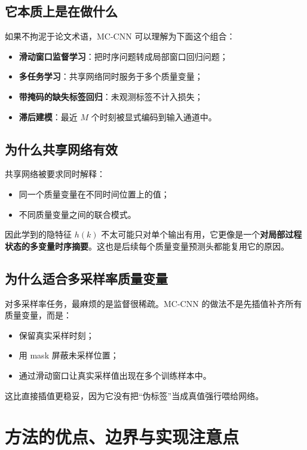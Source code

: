 \documentclass[UTF8]{ctexart}
\begin{document}
\subsection{它本质上是在做什么}

如果不拘泥于论文术语，MC-CNN 可以理解为下面这个组合：
\begin{itemize}
    \item \textbf{滑动窗口监督学习}：把时序问题转成局部窗口回归问题；
    \item \textbf{多任务学习}：共享网络同时服务于多个质量变量；
    \item \textbf{带掩码的缺失标签回归}：未观测标签不计入损失；
    \item \textbf{滞后建模}：最近 $M$ 个时刻被显式编码到输入通道中。
\end{itemize}

\subsection{为什么共享网络有效}

共享网络被要求同时解释：
\begin{itemize}
    \item 同一个质量变量在不同时间位置上的值；
    \item 不同质量变量之间的联合模式。
\end{itemize}

因此学到的隐特征 $h(k)$ 不太可能只对单个输出有用，它更像是一个\textbf{对局部过程状态的多变量时序摘要}。这也是后续每个质量变量预测头都能复用它的原因。

\subsection{为什么适合多采样率质量变量}

对多采样率任务，最麻烦的是监督很稀疏。MC-CNN 的做法不是先插值补齐所有质量变量，而是：
\begin{itemize}
    \item 保留真实采样时刻；
    \item 用 mask 屏蔽未采样位置；
    \item 通过滑动窗口让真实采样值出现在多个训练样本中。
\end{itemize}

这比直接插值更稳妥，因为它没有把“伪标签”当成真值强行喂给网络。

\section{方法的优点、边界与实现注意点}
\end{document}
